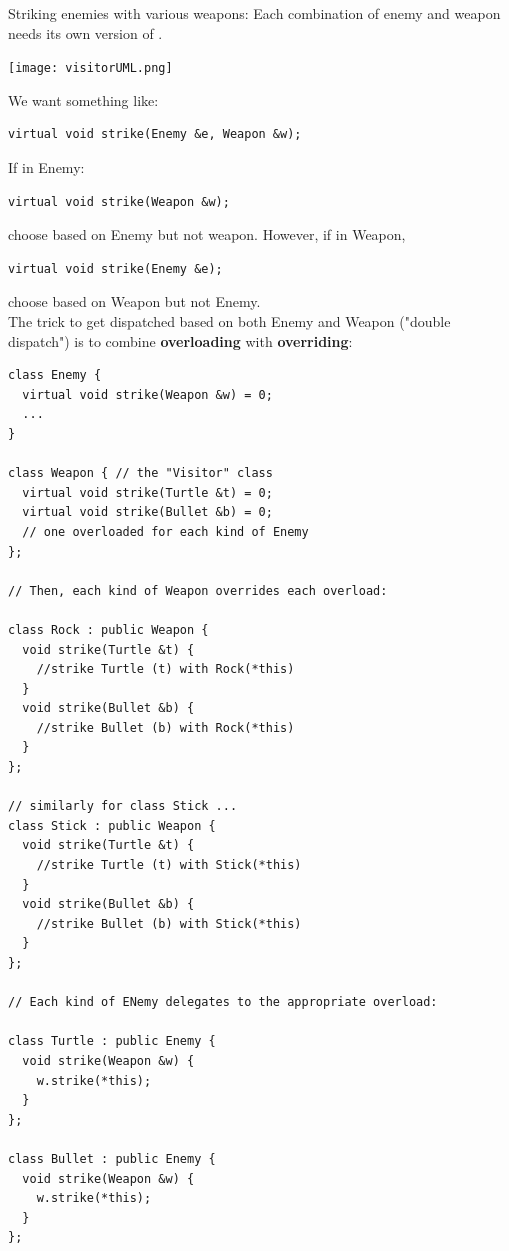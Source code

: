 \documentclass[english, 11pt]{article}
\begin{document}
\begin{exmp}
  Striking enemies with various weapons: Each combination of enemy and weapon needs its own version of .
  \begin{center}
    \texttt{[image: visitorUML.png]}
  \end{center}
\end{exmp}

We want something like:
\begin{lstlisting}[numbers=none]
virtual void strike(Enemy &e, Weapon &w);
\end{lstlisting}
If in Enemy:
\begin{lstlisting}[numbers=none]
  virtual void strike(Weapon &w);
\end{lstlisting}
choose based on Enemy but not weapon. However, if in Weapon,
\begin{lstlisting}[numbers=none]
  virtual void strike(Enemy &e);
\end{lstlisting}
choose based on Weapon but not Enemy. \\

The trick to get dispatched based on both Enemy and Weapon ("double dispatch") is to combine \textbf{overloading} with \textbf{overriding}:

\begin{lstlisting}
class Enemy {
  virtual void strike(Weapon &w) = 0;
  ...
}

class Weapon { // the "Visitor" class
  virtual void strike(Turtle &t) = 0;
  virtual void strike(Bullet &b) = 0;
  // one overloaded for each kind of Enemy
};

// Then, each kind of Weapon overrides each overload:

class Rock : public Weapon {
  void strike(Turtle &t) {
    //strike Turtle (t) with Rock(*this)
  }
  void strike(Bullet &b) {
    //strike Bullet (b) with Rock(*this)
  }
};

// similarly for class Stick ...
class Stick : public Weapon {
  void strike(Turtle &t) {
    //strike Turtle (t) with Stick(*this)
  }
  void strike(Bullet &b) {
    //strike Bullet (b) with Stick(*this)
  }
};

// Each kind of ENemy delegates to the appropriate overload:

class Turtle : public Enemy {
  void strike(Weapon &w) {
    w.strike(*this);
  }
};

class Bullet : public Enemy {
  void strike(Weapon &w) {
    w.strike(*this);
  }
};
\end{lstlisting}
\end{document}

